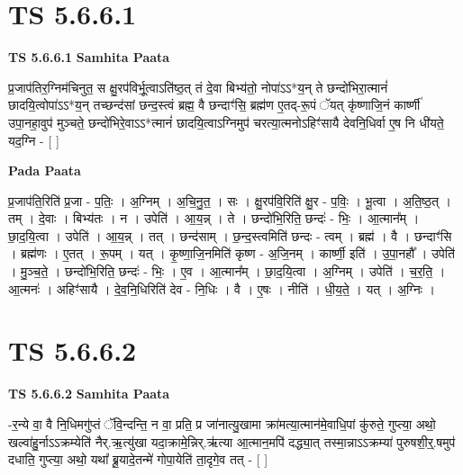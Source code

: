 \documentclass[17pt]{extarticle}
\begin{document}
\section*{ TS 5.6.6.1 }

\textbf{TS 5.6.6.1 } \newline
\textbf{Samhita Paata} \newline

प्र॒जाप॑तिर॒ग्निम॑चिनुत॒ स क्षु॒रप॑विर्भू॒त्वाऽति॑ष्ठ॒त् तं दे॒वा बिभ्य॑तो॒ नोपा॑ऽऽ*य॒न् ते छन्दो॑भिरा॒त्मानं॑ छादयि॒त्वोपा॑ऽऽ*य॒न् तच्छन्द॑सां छन्द॒स्त्वं ब्रह्म॒ वै छन्दाꣳ॑सि॒ ब्रह्म॑ण ए॒तद्-रू॒पं ॅयत् कृ॑ष्णाजि॒नं कार्ष्णी॑ उपा॒नहा॒वुप॑ मुञ्चते॒ छन्दो॑भिरे॒वाऽऽ*त्मानं॑ छादयि॒त्वाऽग्निमुप॑ चरत्या॒त्मनोऽहिꣳ॑सायै देवनि॒धिर्वा ए॒ष नि धी॑यते॒ यद॒ग्नि - [  ] \newline

\textbf{Pada Paata} \newline

प्र॒जाप॑ति॒रिति॑ प्र॒जा - प॒तिः॒ । अ॒ग्निम् । अ॒चि॒नु॒त॒ । सः । क्षु॒रप॑वि॒रिति॑ क्षु॒र - प॒विः॒ । भू॒त्वा । अ॒ति॒ष्ठ॒त् । तम् । दे॒वाः । बिभ्य॑तः । न । उपेति॑ । आ॒य॒न्न् । ते । छन्दो॑भि॒रिति॒ छन्दः॑ - भिः॒ । आ॒त्मान᳚म् । छा॒द॒यि॒त्वा । उपेति॑ । आ॒य॒न्न् । तत् । छन्द॑साम् । छ॒न्द॒स्त्वमिति॑ छन्दः - त्वम् । ब्रह्म॑ । वै । छन्दाꣳ॑सि । ब्रह्म॑णः । ए॒तत् । रू॒पम् । यत् । कृ॒ष्णा॒जि॒नमिति॑ कृष्ण - अ॒जि॒नम् । कार्ष्णी॒ इति॑ । उ॒पा॒नहौ᳚ । उपेति॑ । मु॒ञ्च॒ते॒ । छन्दो॑भि॒रिति॒ छन्दः॑ - भिः॒ । ए॒व । आ॒त्मान᳚म् । छा॒द॒यि॒त्वा । अ॒ग्निम् । उपेति॑ । च॒र॒ति॒ । आ॒त्मनः॑ । अहिꣳ॑सायै । दे॒व॒नि॒धिरिति॑ देव - नि॒धिः । वै । ए॒षः । नीति॑ । धी॒य॒ते॒ । यत् । अ॒ग्निः ।  \newline




\section*{ TS 5.6.6.2 }

\textbf{TS 5.6.6.2 } \newline
\textbf{Samhita Paata} \newline

-र॒न्ये वा॒ वै नि॒धिमगु॑प्तं ॅवि॒न्दन्ति॒ न वा॒ प्रति॒ प्र जा॑नात्यु॒खामा क्रा॑मत्या॒त्मान॑मे॒वाधि॒पां कु॑रुते॒ गुप्त्या॒ अथो॒ खल्वा॑हु॒र्नाऽऽक्रम्येति॑ नैर्.ऋ॒त्यु॑खा यदा॒क्रामे॒न्निर्.ऋ॑त्या आ॒त्मान॒मपि॑ दद्ध्या॒त् तस्मा॒न्नाऽऽक्रम्या॑ पुरुषशी॒र्॒.षमुप॑ दधाति॒ गुप्त्या॒ अथो॒ यथा᳚ ब्रू॒यादे॒तन्मे॑ गोपा॒येति॑ ता॒दृगे॒व तत् - [  ] \newline
\end{document}
